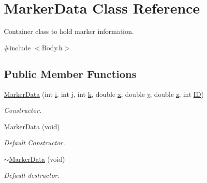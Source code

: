 \hypertarget{class_marker_data}{}\section{Marker\+Data Class Reference}
\label{class_marker_data}


Container class to hold marker information.  




{\ttfamily \#include $<$Body.\+h$>$}

\subsection*{Public Member Functions}
\begin{DoxyCompactItemize}
\item 
\hyperlink{class_marker_data_a6893b09af012bdf7ab510f8b491ca40e}{Marker\+Data} (int \hyperlink{class_marker_data_abb9f15d2132f7007cf0612d53cd969db}{i}, int \hyperlink{class_marker_data_ae48473a1571656cf8f02403cb42a4adc}{j}, int \hyperlink{class_marker_data_a66183b4e9a166279551f4c180d0d71c8}{k}, double \hyperlink{class_marker_data_aade1e2f618efa75989831f028db027cd}{x}, double \hyperlink{class_marker_data_a9b10ce07e886a94fc10e097b2cef2265}{y}, double \hyperlink{class_marker_data_adc00ff164746747a7b379a94abf8a2df}{z}, int \hyperlink{class_marker_data_aae16e1f3245f8ef95ed6170e3775669d}{ID})
\begin{DoxyCompactList}\small\item\em Constructor. \end{DoxyCompactList}\item 
\hyperlink{class_marker_data_a9314e10d84afacc7c6eb6e1fec9c8cf7}{Marker\+Data} (void)
\begin{DoxyCompactList}\small\item\em Default Constructor. \end{DoxyCompactList}\item 
\hyperlink{class_marker_data_aa2f67eda451a48ab5cc4162e12b675e0}{$\sim$\+Marker\+Data} (void)
\begin{DoxyCompactList}\small\item\em Default destructor. \end{DoxyCompactList}\end{DoxyCompactItemize}
